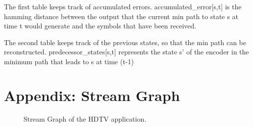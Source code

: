 \documentclass{article}
\begin{document}
The first table keeps track of accumulated errors. accumulated\_error[s,t] is the hamming distance
between the output that the current min path to state s at time t would generate and the
symbols that have been received. 

The second table keeps track of the previous states, so that the min path
can be reconstructed. predecessor\_states[s,t] represents the state s' of the encoder
in the minimum path that leads to s at time (t-1) 




\begin{small}


\end{small}


\section{Appendix: Stream Graph}

\begin{figure}
\center
\epsfxsize=8in
\caption{Stream Graph of the HDTV application.}
\label{fig:hdtv-stream-graph}
\end{figure}
\end{document}
